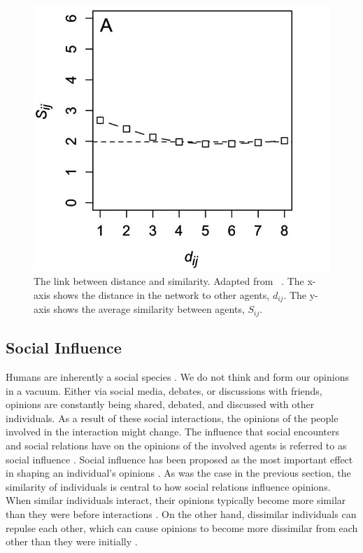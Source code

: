 \documentclass[11pt]{article}
\begin{document}
\begin{figure}[H]
    \centering
    \includegraphics[width=.5\linewidth]{../plots/references/kossinets_watts_distance.jpeg}
  \caption{The link between distance and similarity. Adapted from \ \protect{}. The x-axis shows the distance in the network to other agents, $d_{ij}$. The y-axis shows the average similarity between agents, $S_{ij}$.}
  \label{fig:distance_similarity}
\end{figure}

\subsection{Social Influence}
Humans are inherently a social species \cite{kurzban2015evolution}. We do not think and form our opinions in a vacuum. Either via social media, debates, or discussions with friends, opinions are constantly being shared, debated, and discussed with other individuals. 
As a result of these social interactions, the opinions of the people involved in the interaction might change. 
The influence that social encounters and social relations have on the opinions of the involved agents is referred to as social influence \cite{friedkin_social_1990}. Social influence has been proposed as the most important effect in shaping an individual’s opinions \cite{chacoma_opinion_2015, flache_between_2018}. As was the case in the previous section, the similarity of individuals is central to how social relations influence opinions. When similar individuals interact, their opinions typically become more similar than they were before interactions \cite{takacs_discrepancy_2016}. On the other hand, dissimilar individuals can repulse each other, which can cause opinions to become more dissimilar from each other than they were initially \cite{hilmert2006positive, cikara2014neuroscience}.  
\end{document}
